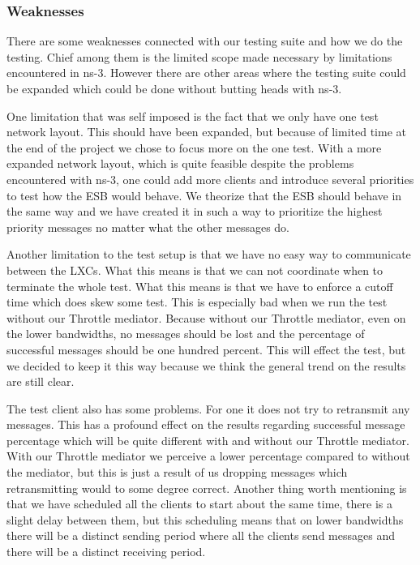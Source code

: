 \subsubsection{Weaknesses}\label{Testing:About:Weaknesses}
	There are some weaknesses connected with our testing suite and how we do the testing. Chief among them is the limited scope made necessary by limitations encountered in ns-3. However there are other areas where the testing suite could be expanded which could be done without butting heads with ns-3.
	
	One limitation that was self imposed is the fact that we only have one test network layout. This should have been expanded, but because of limited time at the end of the project we chose to focus more on the one test. With a more expanded network layout, which is quite feasible despite the problems encountered with ns-3, one could add more clients and introduce several priorities to test how the ESB would behave. We theorize that the ESB should behave in the same way and we have created it in such a way to prioritize the highest priority messages no matter what the other messages do.
	
	Another limitation to the test setup is that we have no easy way to communicate between the LXCs. What this means is that we can not coordinate when to terminate the whole test. What this means is that we have to enforce a cutoff time which does skew some test. This is especially bad when we run the test without our Throttle mediator. Because without our Throttle mediator, even on the lower bandwidths, no messages should be lost and the percentage of successful messages should be one hundred percent. This will effect the test, but we decided to keep it this way because we think the general trend on the results are still clear.
	
	The test client also has some problems. For one it does not try to retransmit any messages. This has a profound effect on the results regarding successful message percentage which will be quite different with and without our Throttle mediator. With our Throttle mediator we perceive a lower percentage compared to without the mediator, but this is just a result of us dropping messages which retransmitting would to some degree correct. Another thing worth mentioning is that we have scheduled all the clients to start about the same time, there is a slight delay between them, but this scheduling means that on lower bandwidths there will be a distinct sending period where all the clients send messages and there will be a distinct receiving period.
	
